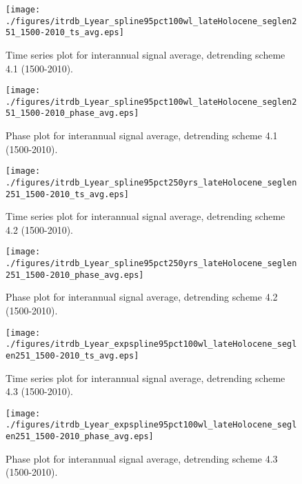 \documentclass[phd,tocprelim]{cornell}
\begin{document}
\begin{figure}[!tbp]
\centering
\begin{minipage}[b]{0.45\textwidth}
\texttt{[image: ./figures/itrdb\_Lyear\_spline95pct100wl\_lateHolocene\_seglen251\_1500-2010\_ts\_avg.eps]}
\caption{Time series plot for interannual signal average, detrending scheme 4.1 (1500-2010).}
\label{ts4.1avg}
\end{minipage}
\hfill
\begin{minipage}[b]{0.45\textwidth}
\texttt{[image: ./figures/itrdb\_Lyear\_spline95pct100wl\_lateHolocene\_seglen251\_1500-2010\_phase\_avg.eps]}
\caption{Phase plot for interannual signal average, detrending scheme 4.1 (1500-2010).}
\label{map4.1avg}
\end{minipage}
\end{figure}

\begin{figure}[!tbp]
\centering
\begin{minipage}[b]{0.45\textwidth}
\texttt{[image: ./figures/itrdb\_Lyear\_spline95pct250yrs\_lateHolocene\_seglen251\_1500-2010\_ts\_avg.eps]}
\caption{Time series plot for interannual signal average, detrending scheme 4.2 (1500-2010).}
\label{ts4.2avg}
\end{minipage}
\hfill
\begin{minipage}[b]{0.45\textwidth}
\texttt{[image: ./figures/itrdb\_Lyear\_spline95pct250yrs\_lateHolocene\_seglen251\_1500-2010\_phase\_avg.eps]}
\caption{Phase plot for interannual signal average, detrending scheme 4.2 (1500-2010).}
\label{map4.2avg}
\end{minipage}
\end{figure}

\begin{figure}[!tbp]
\centering
\begin{minipage}[b]{0.45\textwidth}
\texttt{[image: ./figures/itrdb\_Lyear\_expspline95pct100wl\_lateHolocene\_seglen251\_1500-2010\_ts\_avg.eps]}
\caption{Time series plot for interannual signal average, detrending scheme 4.3 (1500-2010).}
\label{ts4.3avg}
\end{minipage}
\hfill
\begin{minipage}[b]{0.45\textwidth}
\texttt{[image: ./figures/itrdb\_Lyear\_expspline95pct100wl\_lateHolocene\_seglen251\_1500-2010\_phase\_avg.eps]}
\caption{Phase plot for interannual signal average, detrending scheme 4.3 (1500-2010).}
\label{map4.3avg}
\end{minipage}
\end{figure}
\end{document}
